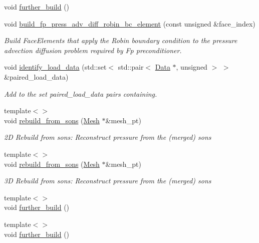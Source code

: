 \begin{DoxyCompactItemize}
void \hyperlink{classoomph_1_1RefineableQCrouzeixRaviartElement_a96c176f20661f2d18a53a434b0e21b70}{further\+\_\+build} ()
\item 
void \hyperlink{classoomph_1_1RefineableQCrouzeixRaviartElement_a734c84a54196ba141791e7471d7c3c7d}{build\+\_\+fp\+\_\+press\+\_\+adv\+\_\+diff\+\_\+robin\+\_\+bc\+\_\+element} (const unsigned \&face\+\_\+index)
\begin{DoxyCompactList}\small\item\em Build Face\+Elements that apply the Robin boundary condition to the pressure advection diffusion problem required by Fp preconditioner. \end{DoxyCompactList}\item 
void \hyperlink{classoomph_1_1RefineableQCrouzeixRaviartElement_ad2389a0bad47e50cb11cb2cea3f57b24}{identify\+\_\+load\+\_\+data} (std\+::set$<$ std\+::pair$<$ \hyperlink{classoomph_1_1Data}{Data} $\ast$, unsigned $>$ $>$ \&paired\+\_\+load\+\_\+data)
\begin{DoxyCompactList}\small\item\em Add to the set {\ttfamily paired\+\_\+load\+\_\+data} pairs containing. \end{DoxyCompactList}\item 
{\footnotesize template$<$$>$ }\\void \hyperlink{classoomph_1_1RefineableQCrouzeixRaviartElement_ad5b7186fc1f963e3b48a10820b44b00b}{rebuild\+\_\+from\+\_\+sons} (\hyperlink{classoomph_1_1Mesh}{Mesh} $\ast$\&mesh\+\_\+pt)
\begin{DoxyCompactList}\small\item\em 2D Rebuild from sons\+: Reconstruct pressure from the (merged) sons \end{DoxyCompactList}\item 
{\footnotesize template$<$$>$ }\\void \hyperlink{classoomph_1_1RefineableQCrouzeixRaviartElement_a55741b5c6305894bb44dd375c9f3711b}{rebuild\+\_\+from\+\_\+sons} (\hyperlink{classoomph_1_1Mesh}{Mesh} $\ast$\&mesh\+\_\+pt)
\begin{DoxyCompactList}\small\item\em 3D Rebuild from sons\+: Reconstruct pressure from the (merged) sons \end{DoxyCompactList}\item 
{\footnotesize template$<$$>$ }\\void \hyperlink{classoomph_1_1RefineableQCrouzeixRaviartElement_add29acd61fe84a78c19e50096ed944dc}{further\+\_\+build} ()
\item 
{\footnotesize template$<$$>$ }\\void \hyperlink{classoomph_1_1RefineableQCrouzeixRaviartElement_aa0cba37e6068fb2a43584bbbd5857a67}{further\+\_\+build} ()
\end{DoxyCompactItemize}
